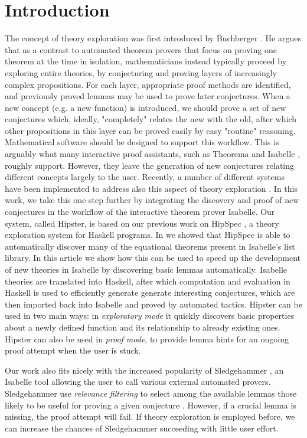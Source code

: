 \section{Introduction}
\label{sec:intro}
The concept of theory exploration was first introduced by Buchberger \cite{buchberger2000theory}. He argues that as a contrast to  automated theorem provers that focus on proving one theorem at the time in isolation, mathematicians instead typically proceed by exploring entire theories, by conjecturing and proving layers of increasingly complex propositions. For each layer, appropriate proof methods are identified, and previously proved lemmas may be used to prove later conjectures. When a new concept (e.g. a new function) is introduced, we should prove a set of new conjectures which, ideally, "completely" relates the new with the old, after which other propositions in this layer can be proved easily by easy "routine" reasoning. Mathematical software should be designed to support this workflow. This is arguably what many interactive proof assistants, such as Theorema \cite{theorema} and Isabelle \cite{isabelle}, roughly support. However, they leave the generation of new conjectures relating different concepts largely to the user. Recently, a number of different systems have been implemented to address also this aspect of theory exploration \cite{McCasland2006,isacosy,isascheme,hipspecCADE}.  In this work, we take this one step further by integrating the discovery and proof of new conjectures in the workflow of the interactive theorem prover Isabelle. Our system, called Hipster, is based on our previous work on HipSpec \cite{hipspecCADE}, a theory exploration system for Haskell programs. In \cite{hipspecCADE} we showed that HipSpec is able to automatically discover many of the equational theorems present in Isabelle's list library. In this article we show how this can be used to speed up the development of new theories in Isabelle by discovering basic lemmas automatically. 
Isabelle theories are translated into Haskell, after which computation and evaluation in Haskell is used to efficiently generate generate interesting conjectures, which are then imported back into Isabelle and proved by automated tactics. Hipster can be used in two main ways: in \emph{exploratory mode} it quickly discovers basic properties about a newly defined function and its relationship to already existing ones. Hipster can also be used in \emph{proof mode}, to provide lemma hints for an ongoing proof attempt when the user is stuck. 

Our work also fits nicely with the increased popularity of Sledgehammer \cite{sledgehammer}, an Isabelle tool allowing the user to call various external automated provers. Sledgehammer use \emph{relevance filtering} to select among the available lemmas those likely to be useful for proving a given conjecture \cite{mash}. However, if a crucial lemma is missing, the proof attempt will fail. If theory exploration is employed before, we can increase the chances of Sledgehammer succeeding with little user effort. 

